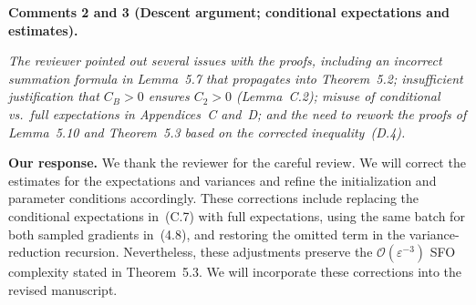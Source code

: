 \documentclass[11pt]{article}
\newtheorem{proposition}{Proposition}
\begin{document}


\vspace{0.5em}
\noindent\textbullet\quad\textbf{Comments 2 and 3
(Descent argument; conditional expectations and estimates).}

\noindent\emph{%
The reviewer pointed out several issues with the proofs, including
an incorrect summation formula in Lemma~5.7 that
propagates into Theorem~5.2; insufficient justification
that $C_B>0$ ensures $C_2>0$ (Lemma~C.2);
misuse of conditional vs.\ full expectations in
Appendices~C and~D; and the need to rework the proofs
of Lemma~5.10 and Theorem~5.3 based on the corrected
inequality~(D.4).}

\vspace{0.5em}
\noindent\textbullet\quad\textbf{Our response.}
We thank the reviewer for the careful review. We will correct
the estimates for the expectations and variances and refine the
initialization and parameter conditions accordingly.
These corrections include replacing the conditional expectations
in~(C.7) with full expectations, using the same batch for both
sampled gradients in~(4.8), and restoring the omitted term in
the variance-reduction recursion.
Nevertheless, these adjustments preserve the
$\mathcal{O}(\varepsilon^{-3})$ SFO complexity stated in
Theorem~5.3. We will incorporate these corrections into the revised manuscript.
\end{document}
